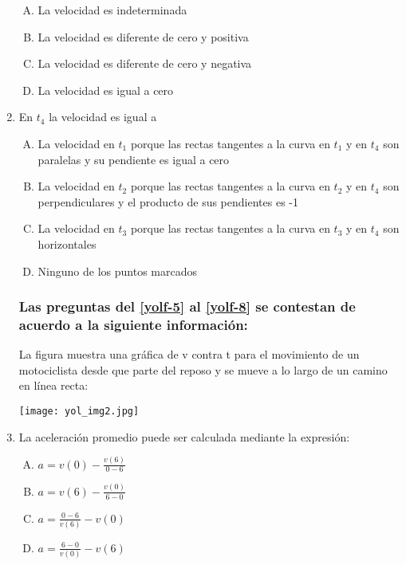 \begin{enumerate}
\begin{enumerate}[(A)]
\item  La velocidad es indeterminada
\item  La velocidad es diferente de cero y positiva
\item La velocidad es diferente de cero y negativa
\item  La velocidad es igual a cero
\end{enumerate}

\newpage
\item  En $t_4$ la velocidad es igual a\label{yolf-4}\\

\begin{enumerate}[(A)]
\item La velocidad en $t_1$ porque las rectas tangentes a la curva en $t_1$ y en $t_4$ son paralelas y su pendiente es igual a cero
\item  La velocidad en $t_2$ porque las rectas tangentes a la curva en $t_2$ y en $t_4$ son perpendiculares y el producto de sus pendientes es -1
\item  La velocidad en $t_3$ porque las rectas tangentes a la curva en $t_3$ y en $t_4$ son horizontales
\item  Ninguno de los puntos marcados

\end{enumerate}

\subsubsection*{Las preguntas del \ref{yolf-5} al \ref{yolf-8} se contestan de acuerdo a la siguiente información:}

\noindent La figura muestra una gráfica de v contra t para el movimiento de un motociclista desde que parte del reposo y se mueve a lo largo de un camino en línea recta:

\begin{center}
\texttt{[image: yol\_img2.jpg]}
\end{center}

\item  La aceleración promedio puede ser calculada mediante la expresión: \label{yolf-5}\\

\begin{enumerate}[(A)]
\item  $a= v(0)-\frac{v(6)}{0-6}$
\item  $a= v(6)-\frac{v(0)}{6-0}$
\item  $a= \frac{0-6}{v(6)}-v(0)$
\item $a=\frac{6-0}{v(0)}-v(6)$


\end{enumerate}
\end{enumerate}
